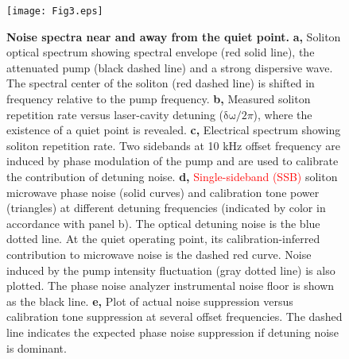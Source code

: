 \documentclass[noshowpacs,amsmath,
twocolumn,
superscriptaddress,
8pt,
aps,prb]{revtex4-2}
\begin{document}
\begin{figure}[!ht]
\texttt{[image: Fig3.eps]}
\caption{{\bf Noise spectra near and away from the quiet point.} {\bf a,} Soliton optical spectrum showing spectral envelope (red solid line), the attenuated pump (black dashed line) and a strong dispersive wave. The spectral center of the soliton (red dashed line) is shifted in frequency relative to the pump frequency. {\bf b,} Measured soliton repetition rate versus laser-cavity detuning ($\mathrm{\delta \omega} / 2 \pi$), where the existence of a quiet point is revealed. {\bf c,} Electrical spectrum showing soliton repetition rate. Two sidebands at 10 kHz offset frequency are induced by phase modulation of the pump and are used to calibrate the contribution of detuning noise. {\bf d,} \textcolor{red}{Single-sideband (SSB)} soliton microwave phase noise (solid curves) and calibration tone power (triangles) at different detuning frequencies (indicated by color in accordance with panel b). The optical detuning noise is the blue dotted line. At the quiet operating point, its calibration-inferred contribution to microwave noise is the dashed red curve. Noise induced by the pump intensity fluctuation (gray dotted line) is also plotted. The phase noise analyzer instrumental noise floor is shown as the black line. {\bf e,} Plot of actual noise suppression versus calibration tone suppression at several offset frequencies. The dashed line indicates the expected phase noise suppression if detuning noise is dominant. }
\label{figure3}
\end{figure}
\end{document}
